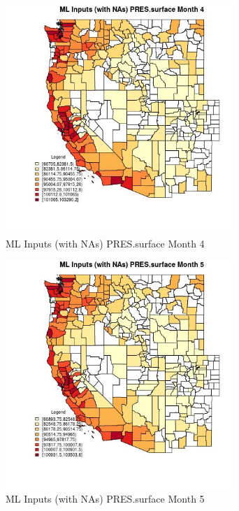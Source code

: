 \begin{figure} 
\centering  
\includegraphics[width=0.77\textwidth]{Code_Outputs/Report_ML_input_PM25_Step4_part_f_de_duplicated_aveswNAs_CountyPRESsurfacemedianMonth4.jpg} 
\caption{\label{fig:Report_ML_input_PM25_Step4_part_f_de_duplicated_aveswNAsCountyPRESsurfacemedianMonth4}ML Inputs (with NAs) PRES.surface Month 4} 
\end{figure} 
 

\begin{figure} 
\centering  
\includegraphics[width=0.77\textwidth]{Code_Outputs/Report_ML_input_PM25_Step4_part_f_de_duplicated_aveswNAs_CountyPRESsurfacemedianMonth5.jpg} 
\caption{\label{fig:Report_ML_input_PM25_Step4_part_f_de_duplicated_aveswNAsCountyPRESsurfacemedianMonth5}ML Inputs (with NAs) PRES.surface Month 5} 
\end{figure} 
 

